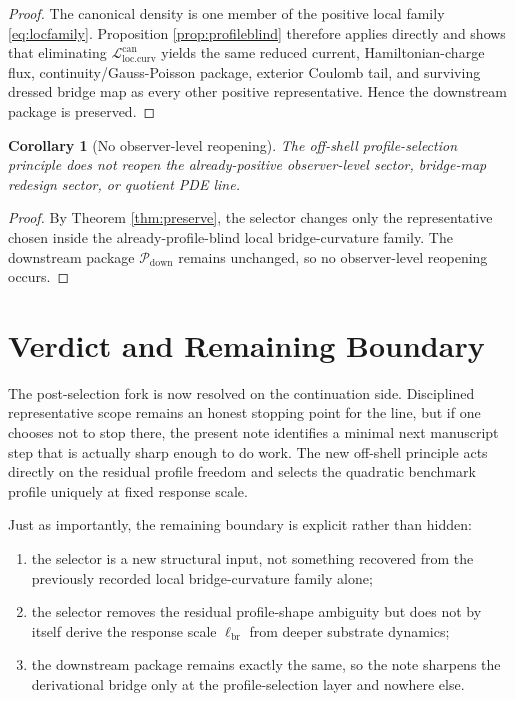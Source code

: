 \documentclass[11pt]{article}
\newcommand{\CurvScale}{\ell_{\mathrm{br}}}
\newcommand{\DownPkg}{\mathscr P_{\mathrm{down}}}
\newtheorem{corollary}{Corollary}
\begin{document}
\begin{proof}
The canonical density is one member of the positive local family \eqref{eq:locfamily}. Proposition \ref{prop:profileblind} therefore applies directly and shows that eliminating \(\mathcal L_{\mathrm{loc.curv}}^{\mathrm{can}}\) yields the same reduced current, Hamiltonian-charge flux, continuity/Gauss-Poisson package, exterior Coulomb tail, and surviving dressed bridge map as every other positive representative. Hence the downstream package is preserved.
\end{proof}

\begin{corollary}[No observer-level reopening]
\label{cor:noobserver}
The off-shell profile-selection principle does not reopen the already-positive observer-level sector, bridge-map redesign sector, or quotient PDE line.
\end{corollary}

\begin{proof}
By Theorem \ref{thm:preserve}, the selector changes only the representative chosen inside the already-profile-blind local bridge-curvature family. The downstream package \(\DownPkg\) remains unchanged, so no observer-level reopening occurs.
\end{proof}

\section{Verdict and Remaining Boundary}

The post-selection fork is now resolved on the continuation side. Disciplined representative scope remains an honest stopping point for the line, but if one chooses not to stop there, the present note identifies a minimal next manuscript step that is actually sharp enough to do work. The new off-shell principle acts directly on the residual profile freedom and selects the quadratic benchmark profile uniquely at fixed response scale.

Just as importantly, the remaining boundary is explicit rather than hidden:
\begin{enumerate}
    \item the selector is a new structural input, not something recovered from the previously recorded local bridge-curvature family alone;
    \item the selector removes the residual profile-shape ambiguity but does not by itself derive the response scale \(\CurvScale\) from deeper substrate dynamics;
    \item the downstream package remains exactly the same, so the note sharpens the derivational bridge only at the profile-selection layer and nowhere else.
\end{enumerate}
\end{document}
